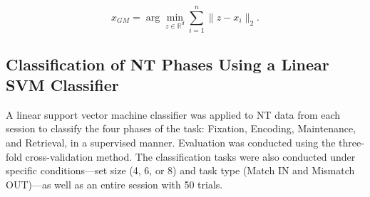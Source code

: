 \begin{equation}
x_{GM} = \arg\min_{z \in \mathbb{R}^d} \sum_{i=1}^n \|z - x_i\|_2.
\end{equation}

\indent
\indent
\subsection{Classification of NT Phases Using a Linear SVM Classifier}
A linear support vector machine classifier was applied to NT data from each session to classify the four phases of the task: Fixation, Encoding, Maintenance, and Retrieval, in a supervised manner. Evaluation was conducted using the three-fold cross-validation method. The classification tasks were also conducted under specific conditions---set size (4, 6, or 8) and task type (Match IN and Mismatch OUT)---as well as an entire session with 50 trials.
\\
\indent
